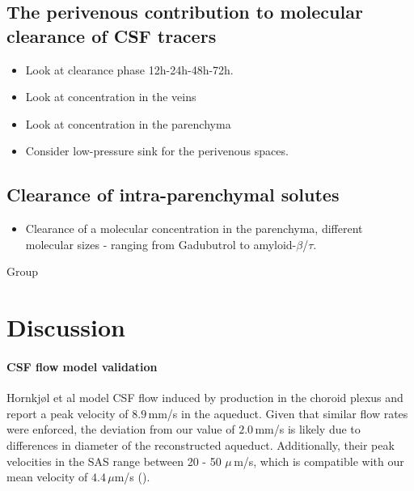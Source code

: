 \documentclass[fleqn,10pt]{wlscirep}
\begin{document}
\subsection*{The perivenous contribution to molecular clearance of CSF tracers}

\begin{itemize}
\item
  Look at clearance phase 12h-24h-48h-72h.
\item
  Look at concentration in the veins
\item
  Look at concentration in the parenchyma
\item
  Consider low-pressure sink for the perivenous spaces.
\end{itemize}

\subsection*{Clearance of intra-parenchymal solutes}

\begin{itemize}
\item
  Clearance of a molecular concentration in the parenchyma, different
  molecular sizes - ranging from Gadubutrol to amyloid-$\beta$/$\tau$.
\end{itemize}

\bigskip

Group\FloatBarrier
\newpage
\section*{Discussion}

\paragraph{CSF flow model validation}

Hornkjøl et al \cite{hornkjol2022csf} model CSF flow induced by production in the choroid plexus and report a peak velocity of $8.9\,$mm/s in the aqueduct. Given that similar flow rates were enforced, the deviation from our value of $2.0\,$mm/s is likely due to differences in diameter of the reconstructed aqueduct. Additionally, their peak velocities in the SAS range between 20 - 50 $\mu\,$m/s, which is compatible with our mean velocity of $4.4\,\mu$m/s ().
\end{document}
